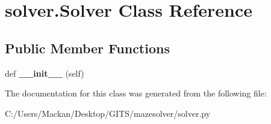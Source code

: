 \hypertarget{classsolver_1_1_solver}{}\section{solver.\+Solver Class Reference}
\label{classsolver_1_1_solver}
\subsection*{Public Member Functions}
\begin{DoxyCompactItemize}
\item 
\mbox{\label{classsolver_1_1_solver_a28d1186130be3a4c89b9c20495552731}} 
def {\bfseries \+\_\+\+\_\+init\+\_\+\+\_\+} (self)
\end{DoxyCompactItemize}


The documentation for this class was generated from the following file\+:\begin{DoxyCompactItemize}
\item 
C\+:/\+Users/\+Mackan/\+Desktop/\+G\+I\+T\+S/mazesolver/solver.\+py\end{DoxyCompactItemize}
